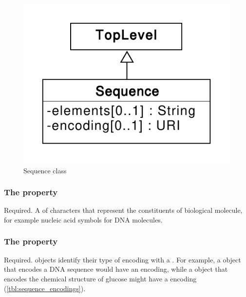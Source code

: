 \begin{figure}[ht]
\begin{center}
\includegraphics[scale=0.6]{uml/sequence}
\caption[]{Sequence class}
\label{uml:sequence}
\end{center}
\end{figure}


\subsubsection*{The  property}
\label{sec:elements}
Required. A  of characters that represent the constituents of biological molecule, for example   nucleic acid symbols for DNA molecules. 


\subsubsection*{The  property}
\label{sec:encoding}
Required.  objects identify their type of encoding with a . For example, a  object that encodes a DNA sequence would have an  encoding, while a  object that encodes the chemical structure of glucose might have a  encoding (\ref{tbl:sequence_encodings}).


